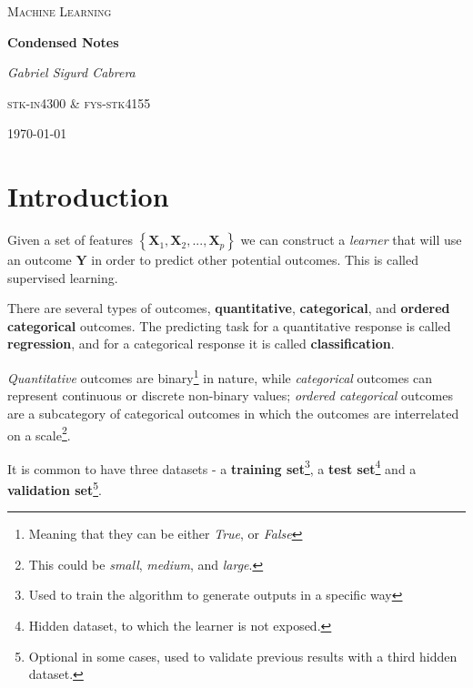 \documentclass[a4paper,10pt,english]{book}
\begin{document}
\newcommand\esymbol[1]{\begin{circuitikz}
\draw (0,0) to [#1] (1,0); \end{circuitikz}}

\begin{titlepage}
	\centering
	{\scshape\LARGE Machine Learning \par}
	\vspace{1cm}
	{\huge\bfseries Condensed Notes \par}
	\vspace{1.5cm}
	{\scshape\Large \par}
	\vspace{2cm}
	{\Large\itshape Gabriel Sigurd Cabrera\par}
	\vfill
	\textsc{stk-in}4300 \& \textsc{fys-stk}4155	\vfill

	{\large \today\par}
\end{titlepage}

\tableofcontents

\chapter{Introduction}

Given a set of features $\left\lbrace \mathbf{X}_1, \mathbf{X}_2, ..., \mathbf{X}_p \right\rbrace$ we can construct a \textit{learner}\label{vocab:learner0} that will use an outcome $\mathbf{Y}$ in order to predict other potential outcomes. This is called supervised learning.

There are several types of outcomes, \textbf{quantitative}\label{vocab:quantitative0}, \textbf{categorical}\label{vocab:categorical0}, and \textbf{ordered categorical} outcomes. The predicting task for a quantitative response is called \textbf{regression}\label{vocab:regression0}, and for a categorical response it is called \textbf{classification}\label{vocab:classification0}.

\textit{Quantitative} outcomes are binary\footnote{Meaning that they can be either \textit{True}, or \textit{False}} in nature, while \textit{categorical} outcomes can represent continuous or discrete non-binary values; \textit{ordered categorical} outcomes are a subcategory of categorical outcomes in which the outcomes are interrelated on a scale\footnote{This could be \textit{small}, \textit{medium}, and \textit{large}.}.

It is common to have three datasets - a \textbf{training set}\footnote{Used to train the algorithm to generate outputs in a specific way}\label{vocab:trainingset0}, a \textbf{test set}\footnote{Hidden dataset, to which the learner is not exposed.}\label{vocab:testset0} and a \textbf{validation set}\footnote{Optional in some cases, used to validate previous results with a third hidden dataset.}\label{vocab:validationset0}.
\end{document}
